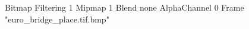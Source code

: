 {Bitmap
	{Filtering 1}
	{Mipmap 1}
	{Blend none}
	{AlphaChannel 0}
	{Frame "euro_bridge_place.tif.bmp"}
}
